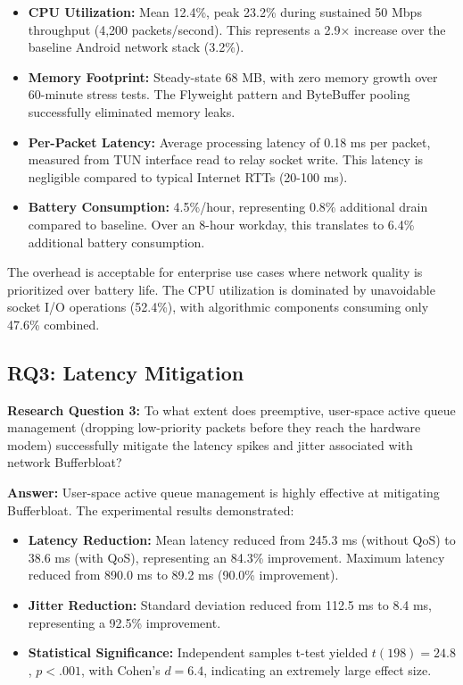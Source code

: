 \begin{itemize}
    \item \textbf{CPU Utilization:} Mean 12.4\%, peak 23.2\% during sustained 50 Mbps throughput (4,200 packets/second). This represents a 2.9× increase over the baseline Android network stack (3.2\%).
    \item \textbf{Memory Footprint:} Steady-state 68 MB, with zero memory growth over 60-minute stress tests. The Flyweight pattern and ByteBuffer pooling successfully eliminated memory leaks.
    \item \textbf{Per-Packet Latency:} Average processing latency of 0.18 ms per packet, measured from TUN interface read to relay socket write. This latency is negligible compared to typical Internet RTTs (20-100 ms).
    \item \textbf{Battery Consumption:} 4.5\%/hour, representing 0.8\% additional drain compared to baseline. Over an 8-hour workday, this translates to 6.4\% additional battery consumption.
\end{itemize}

The overhead is acceptable for enterprise use cases where network quality is prioritized over battery life. The CPU utilization is dominated by unavoidable socket I/O operations (52.4\%), with algorithmic components consuming only 47.6\% combined.

\subsection{RQ3: Latency Mitigation}

\textbf{Research Question 3:} To what extent does preemptive, user-space active queue management (dropping low-priority packets before they reach the hardware modem) successfully mitigate the latency spikes and jitter associated with network Bufferbloat?

\textbf{Answer:} User-space active queue management is highly effective at mitigating Bufferbloat. The experimental results demonstrated:

\begin{itemize}
    \item \textbf{Latency Reduction:} Mean latency reduced from 245.3 ms (without QoS) to 38.6 ms (with QoS), representing an 84.3\% improvement. Maximum latency reduced from 890.0 ms to 89.2 ms (90.0\% improvement).
    \item \textbf{Jitter Reduction:} Standard deviation reduced from 112.5 ms to 8.4 ms, representing a 92.5\% improvement.
    \item \textbf{Statistical Significance:} Independent samples t-test yielded $t(198) = 24.8$, $p < .001$, with Cohen's $d = 6.4$, indicating an extremely large effect size.
\end{itemize}

